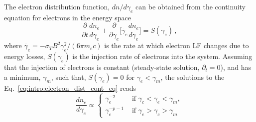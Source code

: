%
%
The electron distribution function, $dn/d\gamma_e$ can be obtained from 
the continuity equation for electrons in the energy space 
%
\begin{equation}
\label{eq:intro:electron_dist_cont_eq}
\frac{\partial }{\partial t}\frac{d n_e}{d\gamma_e} + \frac{\partial}{\partial \gamma_e}\Big[ \dot{\gamma_e}\frac{dn_e}{d\gamma_e} \Big] = S(\gamma_e)\, ,
\end{equation}
%
where $\dot{\gamma_e} = -\sigma_T B^2 \gamma_e^2 / (6\pi m_e c)$ is the rate at 
which electron \ac{LF} changes due to energy losses, $S(\gamma_e)$ is the injection 
rate of electrons into the system.
%
Assuming that the injection of electrons is constant (steady-state solution,
$\partial_t = 0$), and has a minimum, $\gamma_m$, such that, 
$S(\gamma_e) = 0$ for $\gamma_e < \gamma_m$, the solutions to the Eq.~\eqref{eq:intro:electron_dist_cont_eq} reads 
%
\begin{equation}
\frac{dn_e}{d\gamma_e} \propto 
\begin{cases}
\gamma_e^{-2} &\text{ if } \gamma_c < \gamma_e < \gamma_m, \\
\gamma_e^{-p-1} &\text{ if } \gamma_e > \gamma_c > \gamma_m
\end{cases}
\label{eq:afterglow:elec_dist}
\end{equation}
